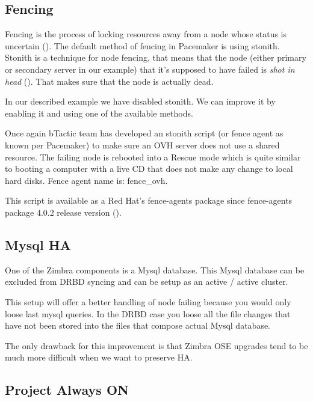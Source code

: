\subsection {\label{subsec:fencing}Fencing}
Fencing is the process of locking resources away from a node whose status is uncertain (\cite{LinuxHAFencing}). The default method of fencing in Pacemaker is using stonith. Stonith is a technique for node fencing, that means that the node (either primary or secondary server in our example) that it's supposed to have failed is \textit{shot in head} (\cite{LinuxHAStonith}). That makes sure that the node is actually dead.

In our described example we have disabled stonith. We can improve it by enabling it and using one of the available methods.

Once again bTactic team has developed an stonith script (or fence agent as known per Pacemaker) to make sure an OVH server does not use a shared resource. The failing node is rebooted into a Rescue mode which is quite similar to booting a computer with a live CD that does not make any change to local hard disks. Fence agent name is: fence\_ovh.

This script is available as a Red Hat's fence-agents package since fence-agents package 4.0.2 release version (\cite{LinuxClusterML201307}).

\subsection {\label{subsection:mysql-ha}Mysql HA}
One of the Zimbra components is a Mysql database. This Mysql database can be excluded from DRBD syncing and can be setup as an active / active cluster.

This setup will offer a better handling of node failing because you would only loose last mysql queries. In the DRBD case you loose all the file changes that have not been stored into the files that compose actual Mysql database.

The only drawback for this improvement is that Zimbra OSE upgrades tend to be much more difficult when we want to preserve HA.

\subsection {Project Always ON}

